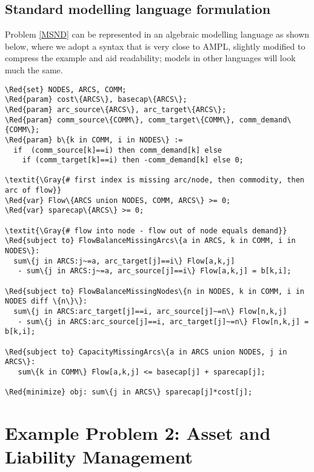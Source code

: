 \documentclass[10pt,a4paper]{report}
\begin{document}
%
%
\subsection{Standard modelling language formulation}

Problem \eqref{MSND} can be represented in an algebraic
modelling language as shown below, where we adopt a
syntax that is very close to AMPL, slightly modified to compress the example
and aid readability; models in other languages will look much the same.
%
\begin{Verbatim}[frame=single,framerule=0.2pt,framesep=5pt,commandchars=\\\{\}]
\Red{set} NODES, ARCS, COMM;
\Red{param} cost\{ARCS\}, basecap\{ARCS\};
\Red{param} arc_source\{ARCS\}, arc_target\{ARCS\};
\Red{param} comm_source\{COMM\}, comm_target\{COMM\}, comm_demand\{COMM\};
\Red{param} b\{k in COMM, i in NODES\} := 
  if  (comm_source[k]==i) then comm_demand[k] else 
    if (comm_target[k]==i) then -comm_demand[k] else 0;

\textit{\Gray{# first index is missing arc/node, then commodity, then arc of flow}}
\Red{var} Flow\{ARCS union NODES, COMM, ARCS\} >= 0;
\Red{var} sparecap\{ARCS\} >= 0;
 
\textit{\Gray{# flow into node - flow out of node equals demand}}
\Red{subject to} FlowBalanceMissingArcs\{a in ARCS, k in COMM, i in NODES\}:
  sum\{j in ARCS:j~=a, arc_target[j]==i\} Flow[a,k,j]  
   - sum\{j in ARCS:j~=a, arc_source[j]==i\} Flow[a,k,j] = b[k,i]; 

\Red{subject to} FlowBalanceMissingNodes\{n in NODES, k in COMM, i in NODES diff \{n\}\}:
  sum\{j in ARCS:arc_target[j]==i, arc_source[j]~=n\} Flow[n,k,j]  
   - sum\{j in ARCS:arc_source[j]==i, arc_target[j]~=n\} Flow[n,k,j] = b[k,i]; 

\Red{subject to} CapacityMissingArcs\{a in ARCS union NODES, j in ARCS\}:
   sum\{k in COMM\} Flow[a,k,j] <= basecap[j] + sparecap[j];

\Red{minimize} obj: sum\{j in ARCS\} sparecap[j]*cost[j];
\end{Verbatim}

\section{Example Problem 2: Asset and Liability Management}
\end{document}
